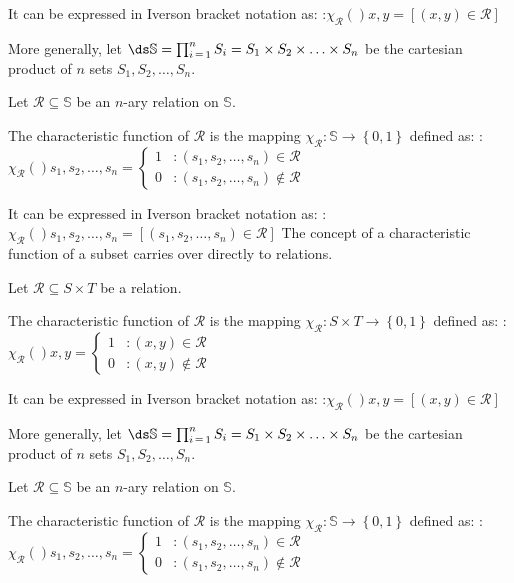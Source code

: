 It can be expressed in Iverson bracket notation as:
:$\chi_\mathcal R \left(   \right){x, y} = \left[ \left( x, y \right) \in \mathcal R \right]$


More generally, let $\ds \mathbb S = \prod_{i \mathop = 1}^n S_i = S_1 \times S_2 \times \ldots \times S_n$ be the cartesian product of $n$ sets $S_1, S_2, \ldots, S_n$.

Let $\mathcal R \subseteq \mathbb S$ be an $n$-ary relation on $\mathbb S$.

The characteristic function of $\mathcal R$ is the mapping $\chi_\mathcal R: \mathbb S \to \left\lbrace 0, 1 \right\rbrace$ defined as:
:$\chi_\mathcal R \left(   \right){s_1, s_2, \ldots, s_n} = \begin {cases} 1 & : \left( s_1, s_2, \ldots, s_n \right) \in \mathcal R \\ 0 & : \left( s_1, s_2, \ldots, s_n \right) \notin \mathcal R \end {cases}$


It can be expressed in Iverson bracket notation as:
:$\chi_\mathcal R \left(   \right){s_1, s_2, \ldots, s_n} = \left[ \left( s_1, s_2, \ldots, s_n \right) \in \mathcal R \right]$
The concept of a characteristic function of a subset carries over directly to relations.


Let $\mathcal R \subseteq S \times T$ be a relation.

The characteristic function of $\mathcal R$ is the mapping $\chi_\mathcal R: S \times T \to \left\lbrace 0, 1 \right\rbrace$ defined as:
:$\chi_\mathcal R \left(   \right){x, y} = \begin {cases} 1 & : \left( x, y \right) \in \mathcal R \\ 0 & : \left( x, y \right) \notin \mathcal R \end{cases}$


It can be expressed in Iverson bracket notation as:
:$\chi_\mathcal R \left(   \right){x, y} = \left[ \left( x, y \right) \in \mathcal R \right]$


More generally, let $\ds \mathbb S = \prod_{i \mathop = 1}^n S_i = S_1 \times S_2 \times \ldots \times S_n$ be the cartesian product of $n$ sets $S_1, S_2, \ldots, S_n$.

Let $\mathcal R \subseteq \mathbb S$ be an $n$-ary relation on $\mathbb S$.

The characteristic function of $\mathcal R$ is the mapping $\chi_\mathcal R: \mathbb S \to \left\lbrace 0, 1 \right\rbrace$ defined as:
:$\chi_\mathcal R \left(   \right){s_1, s_2, \ldots, s_n} = \begin {cases} 1 & : \left( s_1, s_2, \ldots, s_n \right) \in \mathcal R \\ 0 & : \left( s_1, s_2, \ldots, s_n \right) \notin \mathcal R \end {cases}$


